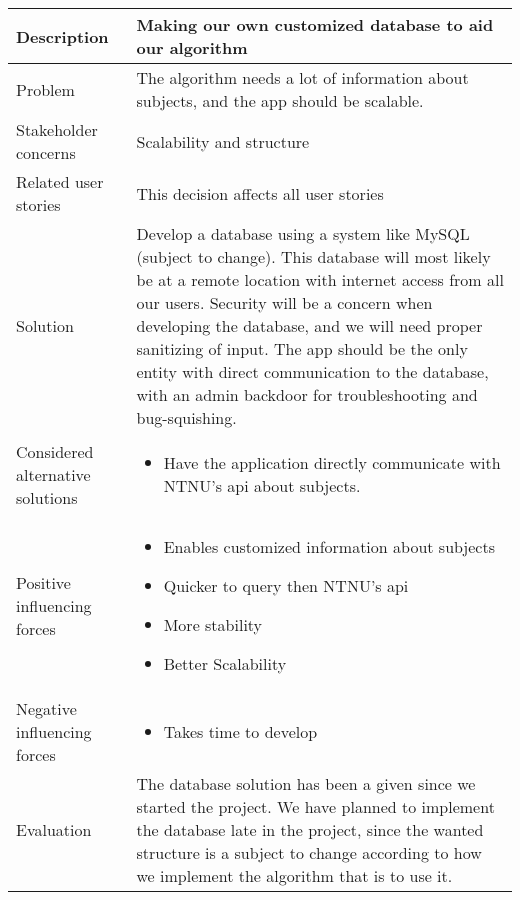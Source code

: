 \documentclass[pdftex, 10pt, norsk, a4paper, twoside]{article}
\numberwithin{equation}{section}
\numberwithin{figure}{section}
\numberwithin{table}{section}
\begin{document}
\newpage

\begin{center} %

\hfill

\section*{}

\begin{tabular}{| >{\centering\arraybackslash} m{4cm} | m{9cm} | }
\hline
Description & Making our own customized database to aid our algorithm \\
\hline
Problem & The algorithm needs a lot of information about subjects, and the app should be scalable.\\
\hline
Stakeholder concerns & Scalability and structure \\
\hline
Related user stories& This decision affects all user stories \\
\hline
Solution & Develop a database using a system like MySQL (subject to change). This database will most likely be at a remote location with internet access from all our users. Security will be a concern when developing the database, and we will need proper sanitizing of input. The app should be the only entity with direct communication to the database, with an admin backdoor for troubleshooting and bug-squishing. \\
\hline
Considered alternative solutions&
\begin{itemize}
    \item Have the application directly communicate with NTNU's api about subjects.
\end{itemize}\\
\hline
Positive influencing forces& 
\begin{itemize}
    \item Enables customized information about subjects
    \item Quicker to query then NTNU's api
    \item More stability
    \item Better Scalability
\end{itemize}\\
\hline
Negative influencing forces& 
\begin{itemize}
    \item Takes time to develop
\end{itemize}\\
\hline
Evaluation& The database solution has been a given since we started the project. We have planned to implement the database late in the project, since the wanted structure is a subject to change according to how we implement the algorithm that is to use it.\\
\hline
\end{tabular}
\end{center}  %
\end{document}
